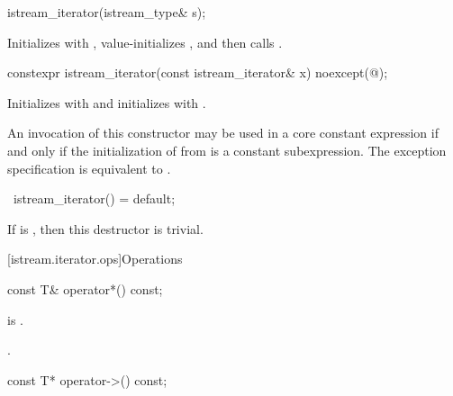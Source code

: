 %
\begin{itemdecl}
istream_iterator(istream_type& s);
\end{itemdecl}

\begin{itemdescr}
\pnum
\effects
Initializes  with ,
value-initializes ,
and then calls .
\end{itemdescr}


%
\begin{itemdecl}
constexpr istream_iterator(const istream_iterator& x) noexcept(@\seebelow@);
\end{itemdecl}

\begin{itemdescr}
\pnum
\effects
Initializes  with  and
initializes  with .

\pnum
\remarks
An invocation of this constructor may be used in a core constant expression
if and only if the initialization of  from 
is a constant subexpression.
The exception specification is equivalent to
.
\end{itemdescr}

%
\begin{itemdecl}
~istream_iterator() = default;
\end{itemdecl}

\begin{itemdescr}
\pnum
\remarks
If  is ,
then this destructor is trivial.
\end{itemdescr}

[istream.iterator.ops]{Operations}

%
\begin{itemdecl}
const T& operator*() const;
\end{itemdecl}

\begin{itemdescr}
\pnum
\expects
{} is .

\pnum
\returns
{}.
\end{itemdescr}

%
\begin{itemdecl}
const T* operator->() const;
\end{itemdecl}

